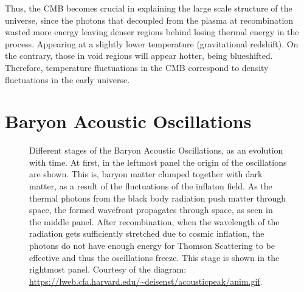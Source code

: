 Thus, the CMB becomes crucial in explaining the large scale structure of the universe, since the photons that decoupled from the plasma at recombination wasted more energy leaving denser regions behind losing thermal energy in the process. Appearing at a slightly lower temperature (gravitational redshift). On the contrary, those in void regions will appear hotter, being blueshifted. Therefore, temperature fluctuations in the CMB correspond to density fluctuations in the early universe. \\

\section{Baryon Acoustic Oscillations}
\label{sec:BAO}

\begin{figure}[t]
	\centering
	\caption[Different time evolution stages of the Baryon Acoustic Oscillations.]{Different stages of the Baryon Acoustic Oscillations, as an evolution with time. At first, in the leftmost panel the origin of the oscillations are shown. This is, baryon matter clumped together with dark matter, as a result of the fluctuations of the inflaton field. As the thermal photons from the black body radiation push matter through space, the formed wavefront propagates through space, as seen in the middle panel. After recombination, when the wavelength of the radiation gets sufficiently stretched due to cosmic inflation, the photons do not have enough energy for Thomson Scattering to be effective and thus the oscillations freeze. This stage is shown in the rightmost panel.   Courtesy of the diagram: \url{https://lweb.cfa.harvard.edu/~deisenst/acousticpeak/anim.gif}.}
	\label{fig:scheme-BAO}
\end{figure}

